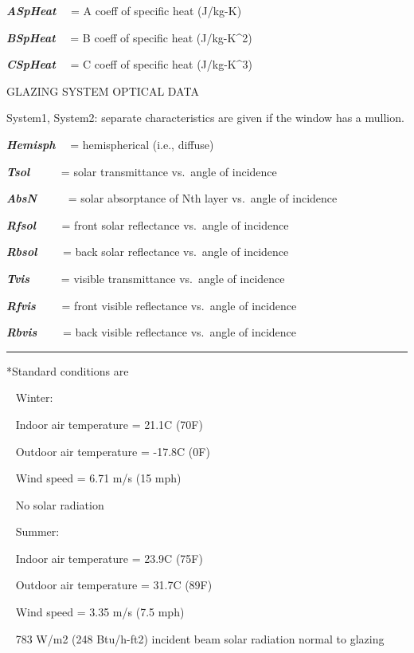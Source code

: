 \textbf{\emph{ASpHeat}}~~ = A coeff of specific heat (J/kg-K)

\textbf{\emph{BSpHeat}}~~ = B coeff of specific heat (J/kg-K\^{}2)

\textbf{\emph{CSpHeat}}~~ = C coeff of specific heat (J/kg-K\^{}3)

GLAZING SYSTEM OPTICAL DATA

System1, System2: separate characteristics are given if the window has a mullion.

\textbf{\emph{Hemisph}}~~ = hemispherical (i.e., diffuse)

\textbf{\emph{Tsol}}~~~~~ = solar transmittance vs.~angle of incidence

\textbf{\emph{AbsN}}~~~~~ = solar absorptance of Nth layer vs.~angle of incidence

\textbf{\emph{Rfsol}}~~~~ = front solar reflectance vs.~angle of incidence

\textbf{\emph{Rbsol}}~~~~ = back solar reflectance vs.~angle of incidence

\textbf{\emph{Tvis}}~~~~~ = visible transmittance vs.~angle of incidence

\textbf{\emph{Rfvis}}~~~~ = front visible reflectance vs.~angle of incidence

\textbf{\emph{Rbvis}}~~~~ = back visible reflectance vs.~angle of incidence

\begin{center}\rule{0.5\linewidth}{0.4pt}\end{center}

*Standard conditions are

~ Winter:

~ Indoor air temperature = 21.1C (70F)

~ Outdoor air temperature = -17.8C (0F)

~ Wind speed = 6.71 m/s (15 mph)

~ No solar radiation

~ Summer:

~ Indoor air temperature = 23.9C (75F)

~ Outdoor air temperature = 31.7C (89F)

~ Wind speed = 3.35 m/s (7.5 mph)

~ 783 W/m2 (248 Btu/h-ft2) incident beam solar radiation normal to glazing

